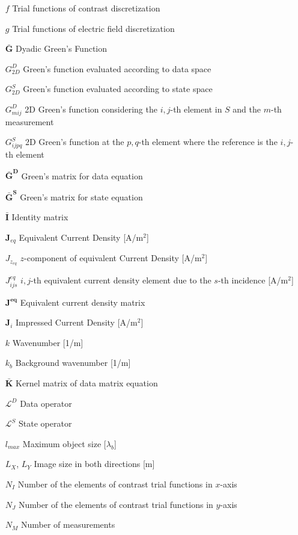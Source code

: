 \begin{itemize}[labelwidth=4em,leftmargin=\dimexpr{}+\relax,align=left]
			\item[$f$] Trial functions of contrast discretization
			\item[$g$] Trial functions of electric field discretization
			\item[$\mathbf{\bar{G}}$] Dyadic Green's Function
			\item[$G^{D}_{2D}$] Green's function evaluated according to data space
			\item[$G^{S}_{2D}$] Green's function evaluated according to state space
			\item[$G^D_{mij}$] 2D Green's function considering the $i,j$-th element in $S$ and the $m$-th measurement
			\item[$G^S_{ijpq}$] 2D Green's function at the $p,q$-th element where the reference is the $i,j$-th element
			\item[$\mathbf{\bar{G}^D}$] Green's matrix for data equation
			\item[$\mathbf{\bar{G}^S}$] Green's matrix for state equation
			\item[$\mathbf{\bar{I}}$] Identity matrix
			\item[$\mathbf{J}_{eq}$] Equivalent Current Density [A/m$^2$]
			\item[$J_{z_{eq}}$] $z$-component of equivalent Current Density [A/m$^2$]
			\item[$J^{eq}_{ijs}$] $i,j$-th equivalent current density element due to the $s$-th incidence [A/m$^2$]
			\item[$\mathbf{J^{eq}}$] Equivalent current density matrix
			\item[$\mathbf{J}_i$] Impressed Current Density [A/m$^2$]
			\item[$k$] Wavenumber [1/m]
			\item[$k_b$] Background wavenumber [1/m]
			\item[$\mathbf{\bar{K}}$] Kernel matrix of data matrix equation
			\item[$\mathcal{L}^D$] Data operator
			\item[$\mathcal{L}^S$] State operator
			\item[$l_{max}$] Maximum object size [$\lambda_b$]
			\item[$L_X$, $L_Y$] Image size in both directions [m]
			\item[$N_I$] Number of the elements of contrast trial functions in $x$-axis
			\item[$N_J$] Number of the elements of contrast trial functions in $y$-axis
			\item[$N_M$] Number of measurements

\end{itemize}
